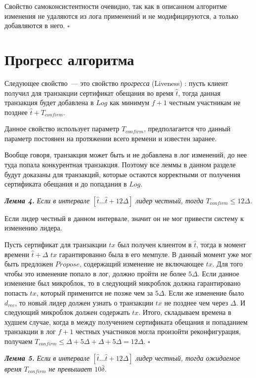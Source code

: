Свойство самоконсистентности очевидно, так как в описанном алгоритме изменения не удаляются из лога применений и не модифицируются, а только добавляются в него. $\square$

\section{Прогресс алгоритма}
\noindent Следующее свойство~--- это свойство \textit{прогресса} (Liveness) \cite{hybrid-consensus}:
пусть клиент получил для транзакции сертификат обещания во время $\hat{t}$, тогда данная транзакция будет добавлена в $Log$ как минимум $f+1$ честным участникам не позднее $\hat{t} + T_{confirm}$.

Данное свойство использует параметр $T_{confirm}$, предполагается что данный параметр постоянен на протяжении всего времени и известен заранее.

Вообще говоря, транзакция может быть и не добавлена в лог изменений, до нее туда попала конкурентная транзакция. Поэтому все леммы в данном разделе будут доказаны для транзакций, которые остаются корректными от получения сертификата обещания и до попадания в $Log$.
\vspace{10pt}

\textbf{\textit{Лемма 4.}} \textit{Если в интервале $[\hat{t}...\hat{t}+12\Delta]$ лидер честный, тогда $T_{confirm} \le 12\Delta$.}

Если лидер честный в данном интервале, значит он не мог привести систему к изменению лидера.

Пусть сертификат для транзакции $tx$ был получен клиентом в $\hat{t}$, тогда
в момент времени $\hat{t}+\Delta$ $tx$ гарантированно была в его мемпуле. В данный момент уже мог быть предложен $Propose$, содержащий изменение не включающее $tx$. Для того чтобы это изменение попало в лог, должно пройти не более $5\Delta$. Если данное изменение был микроблок, то в следующий микроблок должна гарантировано попасть $tx$, который применится не позже чем за $5\Delta$.
Если же изменение было $d_{rec}$, то новый лидер должен узнать о транзакции $tx$ не позднее чем через $\Delta$. И следующий микроблок должен содержать $tx$.
Итого, складываем времена в худшем случае, когда в между получением сертификата обещания и попаданием транзакции в лог $f+1$ честных участников могла произойти реконфигурация, получаем $T_{confirm} \le \Delta + 5\Delta+\Delta+5\Delta=12\Delta$. $\square$
\vspace{10pt}

\textbf{\textit{Лемма 5.}}  \textit{Если в интервале $[\hat{t}...\hat{t}+12\Delta]$ лидер честный, тогда ожидаемое время $T_{confirm}$ не превышает $10\bar{\delta}$.}


